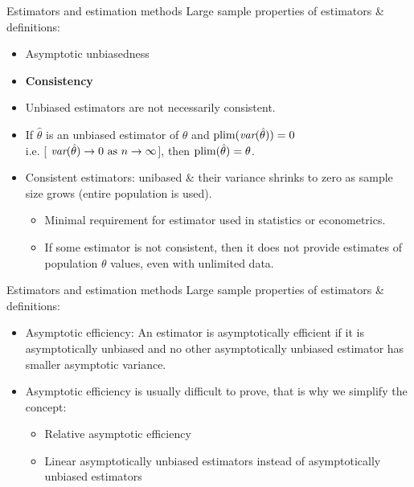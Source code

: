 \documentclass{beamer}
\begin{document}
\begin{frame}{Estimators and estimation methods}
Large sample properties of estimators \& definitions:\\
\medskip
\begin{itemize}
\item Asymptotic unbiasedness 
\bigskip
\item \textbf{Consistency} 
\item Unbiased estimators are not necessarily consistent.
\item If $\hat{\theta}$ is an unbiased estimator of $\theta$ and $\textnormal{plim}(\textit{var}(\hat{\theta}))=0$ \\i.e. [ $\textit{var}(\hat{\theta}) \rightarrow 0 \textnormal{ as } n \rightarrow \infty$], then $\textnormal{plim}(\hat{\theta}) = \theta$. 
\item Consistent estimators: unibased \& their variance shrinks to zero as sample size grows (entire population is used).
\begin{itemize}
\item Minimal requirement for estimator used in statistics or econometrics.
\item If some estimator is not consistent, then it does not provide estimates of population $\theta$ values, even with unlimited data.
\end{itemize}
\end{itemize}
\end{frame}
\begin{frame}{Estimators and estimation methods}
Large sample properties of estimators \& definitions:
\bigskip
\begin{itemize}
\item Asymptotic efficiency: An estimator is asymptotically efficient if it is asymptotically unbiased and no other asymptotically unbiased estimator has smaller asymptotic variance.
\medskip
\item Asymptotic efficiency is usually difficult to prove, that is why we simplify the concept: 
\begin{itemize}
\medskip
\item Relative asymptotic efficiency
\smallskip
\item Linear asymptotically unbiased estimators instead of asymptotically unbiased estimators
\end{itemize}
\end{itemize}
\end{frame}
\end{document}
